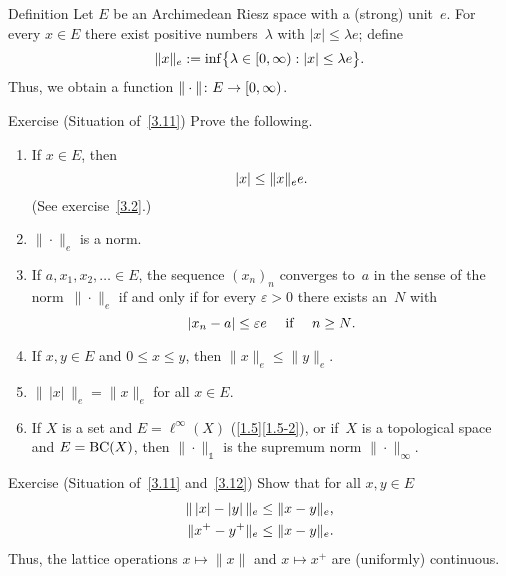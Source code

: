 \documentclass[main.tex]{subfiles}
\begin{document}
%
%
\begin{psec}{3.11}{Definition}
Let $E$ be an Archimedean Riesz space
with a (strong) unit~$e$.
For every $x\in E$
there exist positive numbers~$\lambda$
with $|x|\leq \lambda e$;
define
\begin{equation*}
\| x \|_e := \inf\bigl\{ \lambda\in[0,\infty): |x|\leq \lambda e\bigr\}\text{.}
\end{equation*}
Thus, we obtain a function $\|\cdot\|\colon E \rightarrow [0,\infty)$.
\end{psec}
%
%
\begin{psec}{3.12}{Exercise}
(Situation of~\ref{3.11}) Prove the following.
\begin{enumerate}
\item \label{3.12-1}
If $x\in E$, then 
\begin{equation*}
|x|\leq \|x\|_e e\text{.}
\end{equation*}
(See exercise~\ref{3.2}.)
%
\item \label{3.12-2}
$\|\cdot\|_e$ is a norm.
%
\item \label{3.12-3}
If $a,x_1,x_2,\dotsc\in E$,
the sequence $(x_n)_n$
converges to~$a$ in the sense
of the norm~$\|\cdot\|_e$
if and only if 
for every $\varepsilon>0$ there exists 
an~$N$ with
\begin{equation*}
|x_n-a|\leq \varepsilon e \quad\text{ if }\quad n\geq N\text{.} 
\end{equation*}
%
\item \label{3.12-4}
If $x,y\in E$ and $0\leq x\leq y$,
then $\|x\|_e \leq \|y\|_e$.
%
\item \label{3.12-5}
$\| \, | x|\, \|_e=\| x \|_e$ for all $x\in E$.
%
\item \label{3.12-6}
If $X$ is a set and $E=\ell^\infty(X)$
(\ref{1.5}\ref{1.5-2}),
or if~$X$ is a topological space 
and $E=\mathrm{BC}(X)$,
then $\|\cdot\|_\mathbb{1}$ 
is the supremum norm $\|\cdot\|_\infty$.
\end{enumerate}
\end{psec}
%
%
\begin{psec}{3.13}{Exercise}
(Situation of~\ref{3.11} and~\ref{3.12})
Show that for all $x,y\in E$
\begin{align*}
\|\,|x|-|y|\,\|_e & \leq \|x-y\|_e\text{,}\\
\| x^+ - y^+ \|_e & \leq \|x-y\|_e\text{.}
\end{align*}
Thus, the lattice operations $x\mapsto \| x\|$
and $x\mapsto x^+$
are (uniformly) continuous.
\end{psec}
\end{document}
